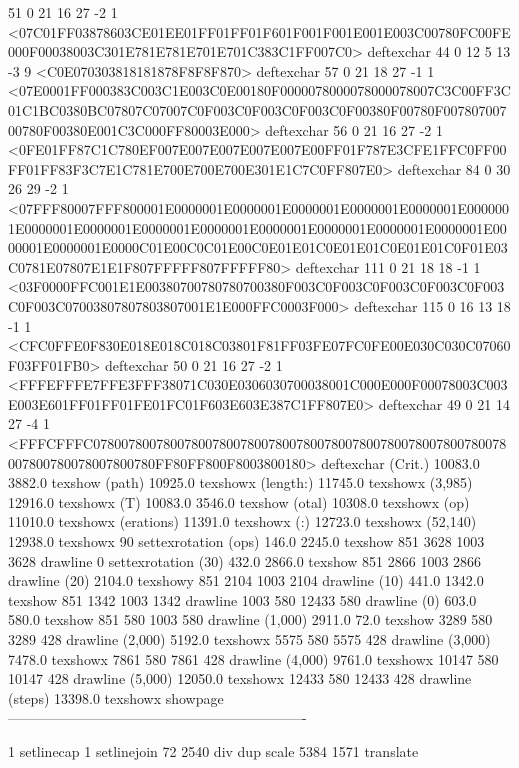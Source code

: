 51 0 21 16 27 -2 1 {{<07C01FF03878603CE01EE01FF01FF01F601F001F001E001E003C00780FC00FE000F00038003C301E781E781E701E701C383C1FF007C0>}} deftexchar
44 0 12 5 13 -3 9 {{<C0E070303818181878F8F8F870>}} deftexchar
57 0 21 18 27 -1 1 {{<07E0001FF000383C003C1E003C0E00180F0000078000078000078007C3C00FF3C01C1BC0380BC07807C07007C0F003C0F003C0F003C0F00380F00780F00780700700780F00380E001C3C000FF80003E000>}} deftexchar
56 0 21 16 27 -2 1 {{<0FE01FF87C1C780EF007E007E007E007E007E00FF01F787E3CFE1FFC0FF00FF01FF83F3C7E1C781E700E700E700E301E1C7C0FF807E0>}} deftexchar
84 0 30 26 29 -2 1 {{<07FFF80007FFF800001E0000001E0000001E0000001E0000001E0000001E0000001E0000001E0000001E0000001E0000001E0000001E0000001E0000001E0000001E0000001E0000001E0000C01E00C0C01E00C0E01E01C0E01E01C0E01E01C0F01E03C0781E07807E1E1F807FFFFF807FFFFF80>}} deftexchar
111 0 21 18 18 -1 1 {{<03F0000FFC001E1E00380700780780700380F003C0F003C0F003C0F003C0F003C0F003C07003807807803807001E1E000FFC0003F000>}} deftexchar
115 0 16 13 18 -1 1 {{<CFC0FFE0F830E018E018C018C03801F81FF03FE07FC0FE00E030C030C07060F03FF01FB0>}} deftexchar
50 0 21 16 27 -2 1 {{<FFFEFFFE7FFE3FFF38071C030E0306030700038001C000E000F00078003C003E003E601FF01FF01FE01FC01F603E603E387C1FF807E0>}} deftexchar
49 0 21 14 27 -4 1 {{<FFFCFFFC07800780078007800780078007800780078007800780078007800780078007800780078007800780FF80FF800F8003800180>}} deftexchar
(Crit.) 10083.0 3882.0 texshow
(path) 10925.0 texshowx
(length:) 11745.0 texshowx
(3,985) 12916.0 texshowx
(T) 10083.0 3546.0 texshow
(otal) 10308.0 texshowx
(op) 11010.0 texshowx
(erations) 11391.0 texshowx
(:) 12723.0 texshowx
(52,140) 12938.0 texshowx
90 settexrotation
(ops) 146.0 2245.0 texshow
851 3628 1003 3628 drawline
0 settexrotation
(30) 432.0 2866.0 texshow
851 2866 1003 2866 drawline
(20) 2104.0 texshowy
851 2104 1003 2104 drawline
(10) 441.0 1342.0 texshow
851 1342 1003 1342 drawline
1003 580 12433 580 drawline
(0) 603.0 580.0 texshow
851 580 1003 580 drawline
(1,000) 2911.0 72.0 texshow
3289 580 3289 428 drawline
(2,000) 5192.0 texshowx
5575 580 5575 428 drawline
(3,000) 7478.0 texshowx
7861 580 7861 428 drawline
(4,000) 9761.0 texshowx
10147 580 10147 428 drawline
(5,000) 12050.0 texshowx
12433 580 12433 428 drawline
(steps) 13398.0 texshowx
showpage
----------------------------------------------------------------

1 setlinecap 1 setlinejoin
72 2540 div dup scale
5384 1571 translate


